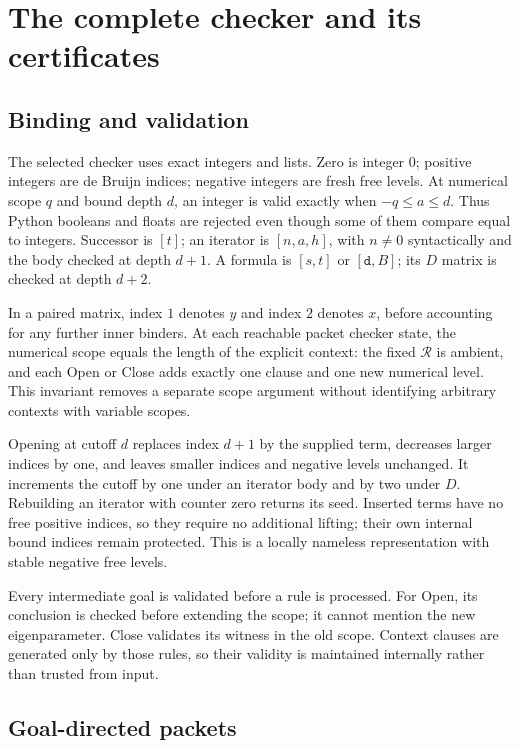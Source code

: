 \documentclass[11pt]{article}
\theoremstyle{definition}
\newcommand{\RR}{\mathcal R}
\begin{document}
\section{The complete checker and its certificates}
\label{sec:checker}

\subsection{Binding and validation}

The selected checker uses exact integers and lists. Zero is integer $0$;
positive integers are de Bruijn indices; negative integers are fresh free
levels. At numerical scope $q$ and bound depth $d$, an integer is valid
exactly when $-q\le a\le d$. Thus Python booleans and floats are rejected
even though some of them compare equal to integers. Successor is $[t]$;
an iterator is $[n,a,h]$, with $n\ne0$ syntactically and the body checked
at depth $d+1$. A formula is $[s,t]$ or $[\texttt{d},B]$; its $D$ matrix
is checked at depth $d+2$.

In a paired matrix, index $1$ denotes $y$ and index $2$ denotes $x$,
before accounting for any further inner binders. At each reachable packet
checker state, the numerical scope equals the length of the explicit
context: the fixed $\RR$ is ambient, and each Open or Close adds exactly
one clause and one new numerical level. This invariant removes a separate
scope argument without identifying arbitrary contexts with variable scopes.

Opening at cutoff $d$ replaces index $d+1$ by the supplied term, decreases
larger indices by one, and leaves smaller indices and negative levels
unchanged. It increments the cutoff by one under an iterator body and by
two under $D$. Rebuilding an iterator with counter zero returns its seed.
Inserted terms have no free positive indices, so they require no additional
lifting; their own internal bound indices remain protected. This is a
locally nameless representation with stable negative free levels.

Every intermediate goal is validated before a rule is processed.
For Open, its conclusion is checked before extending the scope; it cannot
mention the new eigenparameter. Close validates its witness in the old
scope. Context clauses are generated only by those rules, so their validity
is maintained internally rather than trusted from input.

\subsection{Goal-directed packets}
\end{document}

